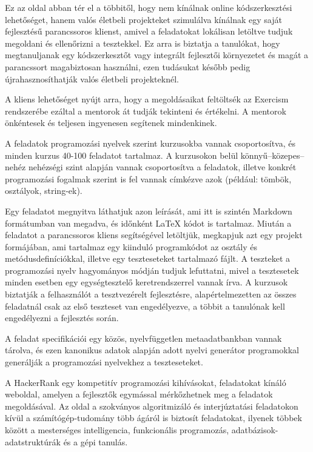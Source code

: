 Ez az oldal abban tér el a többitől, hogy nem kínálnak online kódszerkesztési lehetőséget, hanem valós életbeli projekteket szimulálva kínálnak egy saját fejlesztésű parancssoros klienst, amivel a feladatokat lokálisan letöltve tudjuk megoldani és ellenőrizni a tesztekkel. Ez arra is biztatja a tanulókat, hogy megtanuljanak egy kódszerkesztőt vagy integrált fejlesztői környezetet és magát a parancssort magabiztosan használni, ezen tudásukat később pedig újrahasznosíthatják valós életbeli projekteknél.

A kliens lehetőséget nyújt arra, hogy a megoldásaikat feltöltsék az Exercism rendszerébe ezáltal a mentorok át tudják tekinteni és értékelni. A mentorok önkéntesek és teljesen ingyenesen segítenek mindenkinek.

A feladatok programozási nyelvek szerint kurzusokba vannak csoportosítva, és minden kurzus 40-100 feladatot tartalmaz. A kurzusokon belül könnyű--közepes--nehéz nehézségi szint alapján vannak csoportosítva a feladatok, illetve konkrét programozási fogalmak szerint is fel vannak címkézve azok (például: tömbök, osztályok, string-ek).

Egy feladatot megnyitva láthatjuk azon leírását, ami itt is szintén Markdown formátumban van megadva, és időnként \LaTeX{} kódot is tartalmaz. Miután a feladatot a parancssoros kliens segítségével letöltjük, megkapjuk azt egy projekt formájában, ami tartalmaz egy kiinduló programkódot az osztály és metódusdefiníciókkal, illetve egy teszteseteket tartalmazó fájlt. A teszteket a programozási nyelv hagyományos módján tudjuk lefuttatni, mivel a tesztesetek minden esetben egy egységtesztelő keretrendszerrel vannak írva. A kurzusok biztatják a felhasználót a tesztvezérelt fejlesztésre, alapértelmezetten az összes feladatnál csak az első teszteset van engedélyezve, a többit a tanulónak kell engedélyezni a fejlesztés során.

A feladat specifikációi egy közös, nyelvfüggetlen metaadatbankban vannak tárolva, és ezen kanonikus adatok alapján adott nyelvi generátor programokkal generálják a programozási nyelvekhez a teszteseteket. \cite{exercism_problem-specifications} \cite{exercism_csharp-generator}


A HackerRank egy kompetitív programozási kihívásokat, feladatokat kínáló weboldal, amelyen a fejlesztők egymással mérkőzhetnek meg a feladatok megoldásával. Az oldal a szokványos algoritmizáló és interjúztatási feladatokon kívül a számítógép-tudomány több ágáról is biztosít feladatokat, ilyenek többek között a mesterséges intelligencia, funkcionális programozás, adatbázisok-adatstruktúrák és a gépi tanulás. \cite{hackerrank} \cite{hackerrank_faq}

